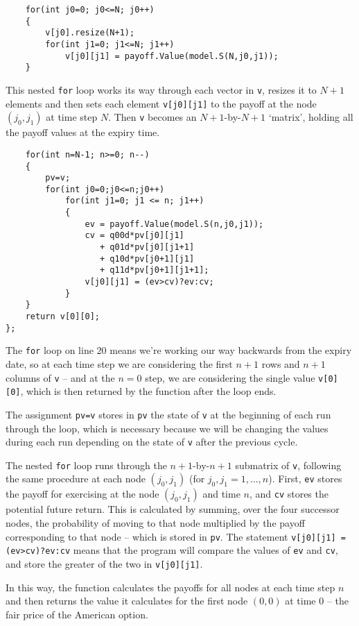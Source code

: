 \documentclass[12pt,a4paper]{article}
\begin{document}
\begin{lstlisting}
    for(int j0=0; j0<=N; j0++)
    {
        v[j0].resize(N+1);
        for(int j1=0; j1<=N; j1++)
            v[j0][j1] = payoff.Value(model.S(N,j0,j1));
    }
\end{lstlisting}

This nested \texttt{for} loop works its way through each vector in \texttt{v}, 
resizes it to $N+1$ elements and then sets each element \texttt{v[j0][j1]} to 
the payoff at the node $(j_0,j_1)$ at time step $N$.
Then \texttt{v} becomes an $N+1$-by-$N+1$ `matrix', holding all the payoff 
values at the expiry time.

\begin{lstlisting}    
    for(int n=N-1; n>=0; n--)
    {
        pv=v;
        for(int j0=0;j0<=n;j0++)
            for(int j1=0; j1 <= n; j1++)
            {
                ev = payoff.Value(model.S(n,j0,j1));
                cv = q00d*pv[j0][j1]
                   + q01d*pv[j0][j1+1]
                   + q10d*pv[j0+1][j1]
                   + q11d*pv[j0+1][j1+1];
                v[j0][j1] = (ev>cv)?ev:cv;
            }
    }
    return v[0][0];
};
\end{lstlisting}

The \texttt{for} loop on line $20$ means we're working our way backwards from the expiry date, so at each time step we are considering the first $n+1$ rows and $n+1$ columns of \texttt{v} -- and at the $n=0$ step, we are considering the single value \texttt{v[0][0]}, which is then returned by the function after the loop ends.

The assignment \texttt{pv=v} stores in \texttt{pv} the state of \texttt{v} at the beginning of each run through the loop, which is necessary because we will be changing the values during each run depending on the state of \texttt{v} after the previous cycle.

The nested \texttt{for} loop runs through the $n+1$-by-$n+1$ submatrix of \texttt{v}, following the same procedure at each node $(j_0,j_1)$ (for $j_0,j_1=1,\dots,n$). First, \texttt{ev} stores the payoff for exercising at the node $(j_0,j_1)$ and time $n$, and \texttt{cv} stores the potential future return. This is calculated by summing, over the four successor nodes, the probability of moving to that node multiplied by the payoff corresponding to that node -- which is stored in \texttt{pv}.
The statement \texttt{v[j0][j1] = (ev>cv)?ev:cv} means that the program will compare the values of \texttt{ev} and \texttt{cv}, and store the greater of the two in \texttt{v[j0][j1]}.

In this way, the function calculates the payoffs for all nodes at each time step $n$ and then returns the value it calculates for the first node $(0,0)$ at time $0$ -- the fair price of the American option.
\end{document}
